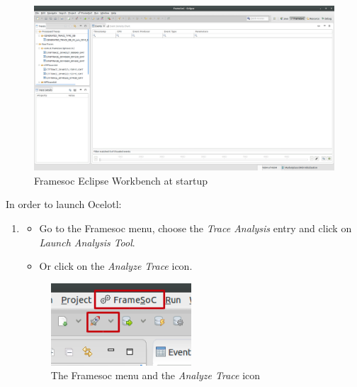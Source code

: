 \documentclass[twoside]{article}
\begin{document}
\begin{sloppypar}
\begin{figure}[h!]
	\centering
    \includegraphics[width=1.0\textwidth]{images/framesoc_launch.png}
	\caption{Framesoc Eclipse Workbench at startup}
	\label{frameLaunch}
\end{figure}

In order to launch Ocelotl:

\begin{enumerate}
	\item 
	\begin{itemize}
		\item Go to the Framesoc menu, choose the \textit{Trace Analysis} entry and click on \textit{Launch Analysis Tool}. 
		\item Or click on the \textit{Analyze Trace} icon.
	\end{itemize}

	\begin{figure}[h!]
		\centering
		\includegraphics[scale=0.5]{images/labeled.png}
		\caption{The Framesoc menu and the \textit{Analyze Trace} icon}
		\label{launchOcelotl}
	\end{figure}
	

\end{enumerate}
\end{sloppypar}
\end{document}
